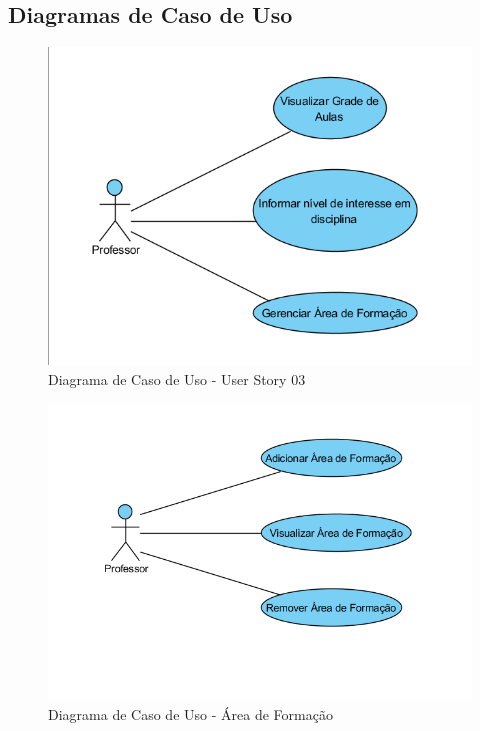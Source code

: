 \documentclass{abnt}
\begin{document}
		\subsection{Diagramas de Caso de Uso}
			\begin{figure}[h]
				\begin{center}
				 \includegraphics[width=450px]{CasoUsoUserStory3}
				 \caption{Diagrama de Caso de Uso - User Story 03}
				 \label{fig:CasoUsoUserStory3}
				\end{center}
			\end{figure}
			
			\begin{figure}[h]
				\begin{center}
				 \includegraphics[width=450px]{CasoUsoAreaFormacao}
				 \caption{Diagrama de Caso de Uso - Área de Formação}
				 \label{fig:CasoUsoAreaFormacao}
				\end{center}
			\end{figure}
			
\end{document}
